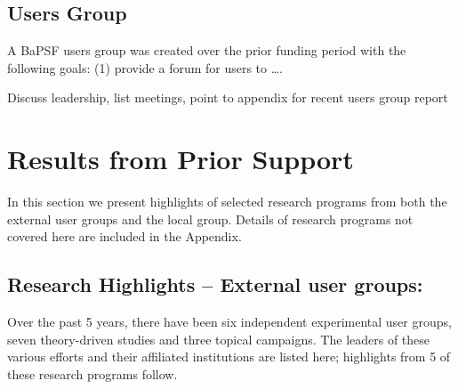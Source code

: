 \documentclass[11pt]{article}
\begin{document}
\subsection{Users Group}

A BaPSF users group was created over the prior funding period with the
following goals: (1) provide a forum for users to \ldots{}.

{Discuss leadership, list meetings, point to appendix for recent users
group report}


\section{Results from Prior Support}

In this section we present highlights of selected research programs from
both the external user groups and the local group. Details of research
programs not covered here are included in the Appendix.

\subsection{Research Highlights -- External user groups:}

Over the past 5 years, there have been six independent experimental user
groups, seven theory-driven studies and three topical campaigns. The
leaders of these various efforts and their affiliated institutions are
listed here; highlights from 5 of these research programs follow.
\end{document}
